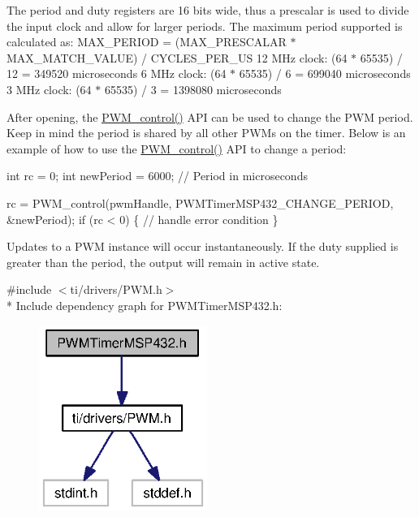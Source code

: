 The period and duty registers are 16 bits wide, thus a prescalar is used to divide the input clock and allow for larger periods. The maximum period supported is calculated as\+: M\+A\+X\+\_\+\+P\+E\+R\+I\+O\+D = (M\+A\+X\+\_\+\+P\+R\+E\+S\+C\+A\+L\+A\+R $\ast$ M\+A\+X\+\_\+\+M\+A\+T\+C\+H\+\_\+\+V\+A\+L\+U\+E) / C\+Y\+C\+L\+E\+S\+\_\+\+P\+E\+R\+\_\+\+U\+S 12 M\+Hz clock\+: (64 $\ast$ 65535) / 12 = 349520 microseconds 6 M\+Hz clock\+: (64 $\ast$ 65535) / 6 = 699040 microseconds 3 M\+Hz clock\+: (64 $\ast$ 65535) / 3 = 1398080 microseconds

After opening, the \hyperlink{_p_w_m_8h_ade999f5b12997479efa1ac85aaf46ef5}{P\+W\+M\+\_\+control()} A\+P\+I can be used to change the P\+W\+M period. Keep in mind the period is shared by all other P\+W\+Ms on the timer. Below is an example of how to use the \hyperlink{_p_w_m_8h_ade999f5b12997479efa1ac85aaf46ef5}{P\+W\+M\+\_\+control()} A\+P\+I to change a period\+:


\begin{DoxyCode}
\textcolor{keywordtype}{int} rc = 0;
\textcolor{keywordtype}{int} newPeriod = 6000;   \textcolor{comment}{// Period in microseconds}

rc = PWM_control(pwmHandle, PWMTimerMSP432_CHANGE_PERIOD, &newPeriod);
\textcolor{keywordflow}{if} (rc < 0) \{
  \textcolor{comment}{// handle error condition}
\}
\end{DoxyCode}


Updates to a P\+W\+M instance will occur instantaneously. If the duty supplied is greater than the period, the output will remain in active state. 

{\ttfamily \#include $<$ti/drivers/\+P\+W\+M.\+h$>$}\\*
Include dependency graph for P\+W\+M\+Timer\+M\+S\+P432.\+h\+:
\nopagebreak
\begin{figure}[H]
\begin{center}
\leavevmode
\includegraphics[width=155pt]{_p_w_m_timer_m_s_p432_8h__incl}
\end{center}
\end{figure}
